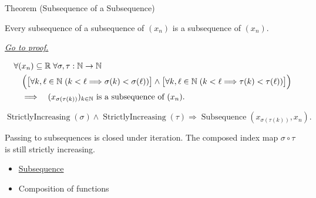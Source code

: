 
\begin{theorembox}{Theorem (Subsequence of a Subsequence)}
\begin{theorem}
\label{thm:subsequence-of-subsequence}
Every subsequence of a subsequence of $(x_n)$ is a subsequence of $(x_n)$.

\smallskip
\noindent
\hyperref[prf:subsequence-of-subsequence]{\textit{Go to proof.}}
\end{theorem}
\end{theorembox}

\begin{remark*}
\[
\begin{aligned}
&\forall (x_n)\subseteq\mathbb{R}\;\forall \sigma,\tau:\mathbb{N}\to\mathbb{N}\\
&\quad\Bigl(
  \bigl[\forall k,\ell\in\mathbb{N}\;(k<\ell\Longrightarrow\sigma(k)<\sigma(\ell))\bigr]
  \land
  \bigl[\forall k,\ell\in\mathbb{N}\;(k<\ell\Longrightarrow\tau(k)<\tau(\ell))\bigr]
\Bigr)\\
&\quad\Longrightarrow\quad
(x_{\sigma(\tau(k))})_{k\in\mathbb{N}}\text{ is a subsequence of }(x_n).
\end{aligned}
\]
\end{remark*}

\begin{remark*}
\[
\operatorname{StrictlyIncreasing}(\sigma)
\land
\operatorname{StrictlyIncreasing}(\tau)
\Longrightarrow
\operatorname{Subsequence}(x_{\sigma(\tau(k))},x_n).
\]
\end{remark*}

\begin{remark*}[Interpretation]
Passing to subsequences is closed under iteration. The composed index map
$\sigma\circ\tau$ is still strictly increasing.
\end{remark*}

\begin{dependencies}
\begin{itemize}
  \item \hyperref[def:subsequence]{Subsequence}
  \item Composition of functions
\end{itemize}
\end{dependencies}

